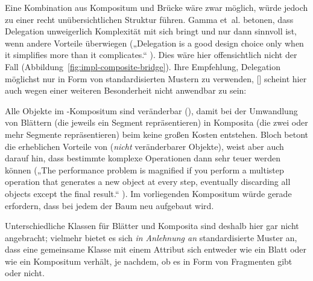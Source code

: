 \documentclass[../main/thesis.tex]{subfiles}
\begin{document}
Eine Kombination aus Kompositum und Brücke wäre zwar möglich, würde jedoch zu einer recht unübersichtlichen Struktur führen.
Gamma et~al. betonen, dass Delegation unweigerlich Komplexität mit sich bringt und nur dann sinnvoll ist, wenn andere Vorteile überwiegen („Delegation is a good design choice only when it simplifies more than it complicates.“ ).
Dies wäre hier offensichtlich nicht der Fall (Abbildung~\ref{fig:impl-composite-bridge}).
Ihre Empfehlung, Delegation möglichst nur in Form von standardisierten Mustern zu verwenden, [\cfibid] scheint hier auch wegen einer weiteren Besonderheit nicht anwendbar zu sein:

Alle Objekte im -Kompositum sind veränderbar (), damit bei der Umwandlung von Blättern (die jeweils ein Segment repräsentieren) in Komposita (die zwei oder mehr Segmente repräsentieren) beim  keine großen Kosten entstehen.
Bloch betont die erheblichen Vorteile von  (\emph{nicht} veränderbarer Objekte), weist aber auch darauf hin, dass bestimmte komplexe Operationen dann sehr teuer werden können („The performance problem is magnified if you perform a multistep operation that generates a new object at every step, eventually discarding all objects except the final result.“ ).
Im vorliegenden Kompositum würde  gerade erfordern, dass bei jedem  der Baum neu aufgebaut wird.

Unterschiedliche Klassen für Blätter und Komposita sind deshalb hier gar nicht angebracht; vielmehr bietet es sich \emph{in Anlehnung an} standardisierte Muster an, dass eine gemeinsame Klasse mit einem Attribut  sich entweder wie ein Blatt oder wie ein Kompositum verhält, je nachdem, ob es  in Form von Fragmenten gibt oder nicht.

\end{document}
